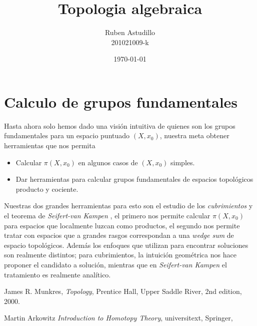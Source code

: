 \documentclass[letterpaper]{article}
\newcommand{\vank}{\emph{Seifert-van Kampen} }
\theoremstyle{definition}
\theoremstyle{plain}
\theoremstyle{plain}
\theoremstyle{plain}
\theoremstyle{remark}
\begin{document}
\title{Topologia algebraica}
\author{Ruben Astudillo \\ 201021009-k}
\date{\today}
\maketitle


\tableofcontents



\section{Calculo de grupos fundamentales}
Hasta ahora solo hemos dado una visión intuitiva de quienes son los
grupos fundamentales para un espacio puntuado \((X,x_0)\), nuestra meta
obtener herramientas que nos permita
\begin{itemize}
\item Calcular \(\pi (X, x_0)\) en algunos casos de \((X,x_0)\) simples.
\item Dar herramientas para calcular grupos fundamentales de espacios
  topológicos producto y cociente.
\end{itemize}
Nuestras dos grandes herramientas para esto son el estudio de los
\emph{cubrimientos} y el teorema de \vank , el primero nos permite
calcular \(\pi (X, x_0)\) para espacios que localmente luzcan como
productos, el segundo nos permite tratar con espacios que a grandes
rasgos correspondan a una \emph{wedge sum} de espacio topológicos.
Además los enfoques que utilizan para encontrar soluciones son realmente
distintos; para cubrimientos, la intuición geométrica nos hace
proponer el candidato a solución, mientras que en \vank el tratamiento
es realmente analítico.




\begin{thebibliography}{9}

  James R. Munkres,
  \emph{Topology},
  Prentice Hall, Upper Saddle River,
  2nd edition,
  2000.

  Martin Arkowitz
  \emph{Introduction to Homotopy Theory},
  universitext, Springer,
\end{thebibliography}
\end{document}
